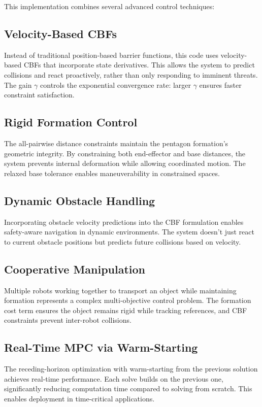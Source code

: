 \documentclass[12pt,a4paper]{article}
\begin{document}
This implementation combines several advanced control techniques:

\subsection{Velocity-Based CBFs}
Instead of traditional position-based barrier functions, this code uses velocity-based CBFs that incorporate state derivatives. This allows the system to predict collisions and react proactively, rather than only responding to imminent threats. The gain $\gamma$ controls the exponential convergence rate: larger $\gamma$ ensures faster constraint satisfaction.

\subsection{Rigid Formation Control}
The all-pairwise distance constraints maintain the pentagon formation's geometric integrity. By constraining both end-effector and base distances, the system prevents internal deformation while allowing coordinated motion. The relaxed base tolerance enables maneuverability in constrained spaces.

\subsection{Dynamic Obstacle Handling}
Incorporating obstacle velocity predictions into the CBF formulation enables safety-aware navigation in dynamic environments. The system doesn't just react to current obstacle positions but predicts future collisions based on velocity.

\subsection{Cooperative Manipulation}
Multiple robots working together to transport an object while maintaining formation represents a complex multi-objective control problem. The formation cost term ensures the object remains rigid while tracking references, and CBF constraints prevent inter-robot collisions.

\subsection{Real-Time MPC via Warm-Starting}
The receding-horizon optimization with warm-starting from the previous solution achieves real-time performance. Each solve builds on the previous one, significantly reducing computation time compared to solving from scratch. This enables deployment in time-critical applications.
\end{document}
